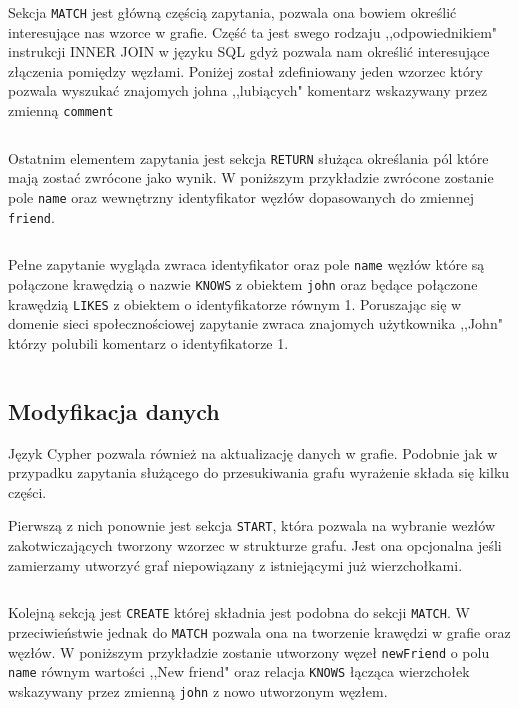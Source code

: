 \documentclass[brudnopis]{xmgr}
\begin{document}
\inputminted{cypher}{listings/cypher/start-section.cypher}

Sekcja \texttt{MATCH} jest główną częścią zapytania, pozwala ona bowiem określić interesujące nas wzorce w grafie. Część ta jest swego rodzaju ,,odpowiednikiem" instrukcji INNER JOIN w języku SQL gdyż pozwala nam określić interesujące złączenia pomiędzy węzłami. Poniżej został zdefiniowany jeden wzorzec który pozwala wyszukać znajomych johna ,,lubiących" komentarz wskazywany przez zmienną \texttt{comment}

\inputminted{cypher}{listings/cypher/match-section.cypher}

Ostatnim elementem zapytania jest sekcja \texttt{RETURN} służąca określania pól które mają zostać zwrócone jako wynik. W poniższym przykładzie zwrócone zostanie pole \texttt{name} oraz wewnętrzny identyfikator węzłów dopasowanych do zmiennej \texttt{friend}.

\inputminted{cypher}{listings/cypher/return-section.cypher}

Pełne zapytanie wygląda zwraca identyfikator oraz pole \texttt{name} węzłów które są połączone krawędzią o nazwie \texttt{KNOWS} z obiektem \texttt{john} oraz będące połączone krawędzią \texttt{LIKES} z obiektem o identyfikatorze równym {1}. Poruszając się w domenie sieci społecznościowej zapytanie zwraca znajomych użytkownika ,,John" którzy polubili komentarz o identyfikatorze {1}.

\inputminted{cypher}{listings/cypher/sample-query.cypher}

\subsection{Modyfikacja danych}

Język Cypher pozwala również na aktualizację danych w grafie. Podobnie jak w przypadku zapytania służącego do przesukiwania grafu wyrażenie składa się kilku części.

Pierwszą z nich ponownie jest sekcja \texttt{START}, która pozwala na wybranie wezłów zakotwiczających tworzony wzorzec w strukturze grafu. Jest ona opcjonalna jeśli zamierzamy utworzyć graf niepowiązany z istniejącymi już wierzchołkami.

\inputminted{cypher}{listings/cypher/start-section.cypher}

Kolejną sekcją jest \texttt{CREATE} której składnia jest podobna do sekcji \texttt{MATCH}. W przeciwieństwie jednak do \texttt{MATCH} pozwala ona na tworzenie krawędzi w grafie oraz węzłów. W poniższym przykładzie zostanie utworzony węzeł \texttt{newFriend} o polu \texttt{name} równym wartości ,,New friend" oraz relacja \texttt{KNOWS} łącząca wierzchołek wskazywany przez zmienną \texttt{john} z nowo utworzonym węzłem.
\end{document}
